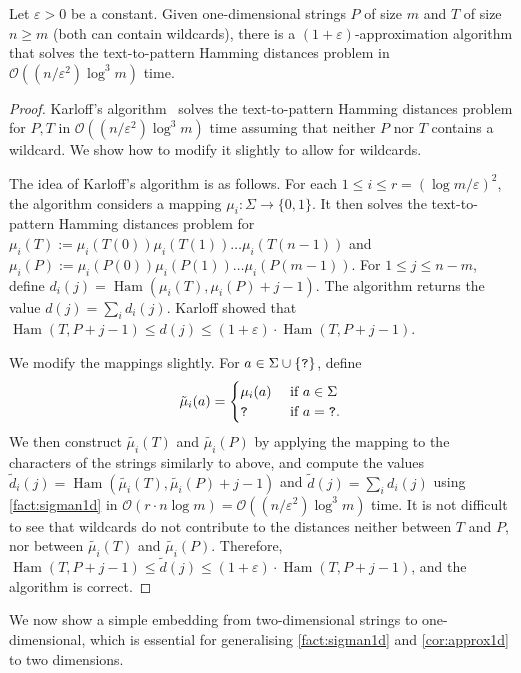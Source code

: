 \documentclass[twoside,leqno]{article}
\renewcommand{\O}{\mathcal{O}}
\DeclareMathOperator*{\Ham}{Ham}
\begin{document}
\begin{corollary}\label{cor:approx1d}
Let $\varepsilon > 0$ be a constant. Given one-dimensional strings $P$ of size $m$ and $T$ of size $n \ge m$ (both can contain wildcards), there is a $(1+\varepsilon)$-approximation algorithm that solves the text-to-pattern Hamming distances problem in $\O((n/\varepsilon^2)  \log^3 m)$ time.
\end{corollary}
\begin{proof}
Karloff's algorithm~\cite{Karloff1993} solves the text-to-pattern Hamming distances problem for $P,T$ in $\O((n/\varepsilon^2)  \log^3 m)$ time assuming that neither $P$ nor $T$ contains a wildcard. We show how to modify it slightly to allow for wildcards. 

The idea of Karloff's algorithm is as follows. For each $1 \le i \le r = (\log m/ \varepsilon)^2$, the algorithm considers a mapping $\mu_i : \Sigma \rightarrow \{0,1\}$. It then solves the text-to-pattern Hamming distances problem for $\mu_i(T) := \mu_i(T(0))\mu_i(T(1)) \ldots \mu_i(T(n-1))$ and $\mu_i(P) := \mu_i(P(0))\mu_i(P(1)) \ldots \mu_i(P(m-1))$. For $1 \le j \le n-m$, define $d_i(j) = \Ham(\mu_i(T), \mu_i(P)+j-1)$. The algorithm returns the value $d(j) = \sum_i d_i(j)$. Karloff showed that $\Ham(T, P+j-1) \le d(j) \le (1+\varepsilon) \cdot \Ham(T, P+j-1)$.

We modify the mappings slightly. For $a \in \Sigma \cup \{\texttt{?}\}$, define
$$
\tilde{\mu}_i(a) = 
\begin{cases}
\mu_i(a) &\text{ if } a \in \Sigma\\
\texttt{?} & \text{ if } a = \texttt{?}.
\end{cases}
$$
We then construct $\tilde{\mu_i}(T)$ and $\tilde{\mu_i}(P)$ by applying the mapping to the characters of the strings similarly to above, and compute the values $\tilde{d}_i(j) = \Ham(\tilde{\mu_i}(T), \tilde{\mu_i}(P)+j-1)$ and $\tilde{d}(j) = \sum_i d_i(j)$ using \cref{fact:sigman1d} in $\O(r \cdot n \log m) = \O((n/\varepsilon^2) \log^3 m)$ time. It is not difficult to see that wildcards do not contribute to the distances neither between $T$ and $P$, nor between $\tilde{\mu_i}(T)$ and $\tilde{\mu_i}(P)$. Therefore, $\Ham(T, P+j-1) \le \tilde{d}(j) \le (1+\varepsilon) \cdot \Ham(T, P+j-1)$, and the algorithm is correct. 
\end{proof}

We now show a simple embedding from two-dimensional strings to one-dimensional, which is essential for generalising \cref{fact:sigman1d} and \cref{cor:approx1d} to two dimensions.
\end{document}
